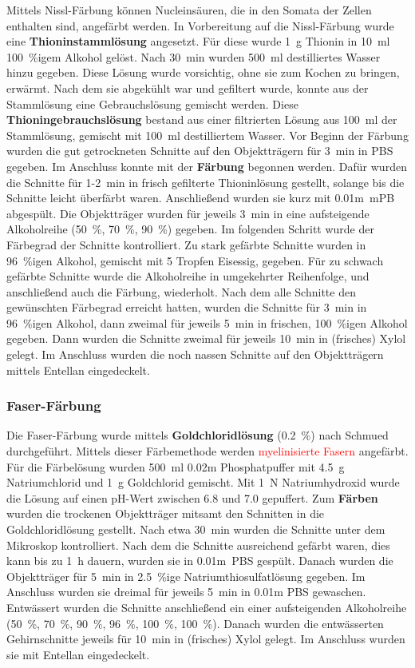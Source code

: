 \documentclass[12pt,a4paper,pdftex]{article}
\begin{document}
Mittels Nissl-Färbung können Nucleinsäuren, die in den Somata der Zellen enthalten sind, angefärbt werden. In Vorbereitung auf die Nissl-Färbung wurde eine \textbf{Thioninstammlösung} angesetzt. Für diese wurde 1~g Thionin in 10~ml 100~\%igem Alkohol gelöst. Nach 30~min wurden 500~ml destilliertes Wasser hinzu gegeben. Diese Lösung wurde vorsichtig, ohne sie zum Kochen zu bringen, erwärmt. Nach dem sie abgekühlt war und gefiltert wurde, konnte aus der Stammlösung eine Gebrauchslösung gemischt werden. Diese \textbf{Thioningebrauchslösung} bestand aus einer filtrierten Lösung aus 100~ml der Stammlösung, gemischt mit 100~ml destilliertem Wasser. Vor Beginn der Färbung wurden die gut getrockneten Schnitte auf den Objektträgern für 3~min in PBS gegeben. Im Anschluss konnte mit der \textbf{Färbung} begonnen werden. Dafür wurden die Schnitte für 1-2~min in frisch gefilterte Thioninlösung gestellt, solange bis die Schnitte leicht überfärbt waren. Anschließend wurden sie kurz mit 0.01m~mPB abgespült. Die Objektträger wurden für jeweils 3~min in eine aufsteigende Alkoholreihe (50~\%, 70~\%, 90~\%) gegeben. Im folgenden Schritt wurde der Färbegrad der Schnitte kontrolliert. Zu stark gefärbte Schnitte wurden in 96~\%igen Alkohol, gemischt mit 5 Tropfen Eisessig, gegeben. Für zu schwach gefärbte Schnitte wurde die Alkoholreihe in umgekehrter Reihenfolge, und anschließend auch die Färbung, wiederholt. Nach dem alle Schnitte den gewünschten Färbegrad erreicht hatten, wurden die Schnitte für 3~min in 96~\%igen Alkohol, dann zweimal für jeweils 5~min in frischen, 100~\%igen Alkohol gegeben. Dann wurden die Schnitte zweimal für jeweils 10~min in (frisches) Xylol gelegt. Im Anschluss wurden die noch nassen Schnitte auf den Objektträgern mittels Entellan eingedeckelt. 

\subsubsection{Faser-Färbung}

Die Faser-Färbung wurde mittels \textbf{Goldchloridlösung} (0.2~\%) nach Schmued durchgeführt. Mittels dieser Färbemethode werden \textcolor{red}{myelinisierte Fasern} angefärbt. Für die Färbelösung wurden 500~ml 0.02m Phosphatpuffer mit 4.5~g Natriumchlorid und 1~g Goldchlorid gemischt. Mit 1~N Natriumhydroxid wurde die Lösung auf einen pH-Wert zwischen 6.8 und 7.0 gepuffert. Zum \textbf{Färben} wurden die trockenen Objektträger mitsamt den Schnitten in die Goldchloridlösung gestellt. Nach etwa 30~min wurden die Schnitte unter dem Mikroskop kontrolliert. Nach dem die Schnitte ausreichend gefärbt waren, dies kann bis zu 1~h dauern, wurden sie in 0.01m~PBS gespült. Danach wurden die Objektträger für 5~min in 2.5~\%ige Natriumthiosulfatlösung gegeben. Im Anschluss wurden sie dreimal für jeweils 5~min in 0.01m PBS gewaschen. Entwässert wurden die Schnitte anschließend ein einer aufsteigenden Alkoholreihe (50~\%, 70~\%, 90~\%, 96~\%, 100~\%, 100~\%). Danach wurden die entwässerten Gehirnschnitte jeweils für 10~min in (frisches) Xylol gelegt. Im Anschluss wurden sie mit Entellan eingedeckelt.
\end{document}
